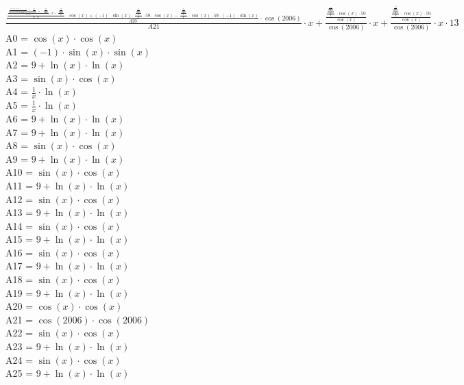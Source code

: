 \documentclass[12pt]{article}
\begin{document}
$\frac{\frac{\frac{\frac{\frac{\frac{\frac{A0 + A1 \cdot A2 - A3 \cdot A4 + A5}{A6 \cdot A7} \cdot x - \frac{A8}{A9}}{x \cdot x} \cdot x - \frac{\frac{A10}{A11}}{x}}{x \cdot x} \cdot x - \frac{\frac{\frac{A12}{A13}}{x}}{x}}{x \cdot x} \cdot x - \frac{\frac{\frac{\frac{A14}{A15}}{x}}{x}}{x}}{x \cdot x} \cdot \cos(x) + (-1) \cdot \sin(x) \cdot \frac{\frac{\frac{\frac{\frac{A16}{A17}}{x}}{x}}{x}}{x} \cdot 59 \cdot \cos(x) - \frac{\frac{\frac{\frac{\frac{A18}{A19}}{x}}{x}}{x}}{x} \cdot \cos(x) \cdot 59 \cdot (-1) \cdot \sin(x)}{A20} \cdot \cos(2006)}{A21} \cdot x + \frac{\frac{\frac{\frac{\frac{\frac{\frac{A22}{A23}}{x}}{x}}{x}}{x} \cdot \cos(x) \cdot 59}{\cos(x)}}{\cos(2006)} \cdot x + \frac{\frac{\frac{\frac{\frac{\frac{\frac{A24}{A25}}{x}}{x}}{x}}{x} \cdot \cos(x) \cdot 59}{\cos(x)}}{\cos(2006)} \cdot x \cdot 13$ \\ 
A0 = $\cos(x) \cdot \cos(x)$ \\ 
A1 = $(-1) \cdot \sin(x) \cdot \sin(x)$ \\ 
A2 = $9 + \ln(x) \cdot \ln(x)$ \\ 
A3 = $\sin(x) \cdot \cos(x)$ \\ 
A4 = $\frac{1}{x} \cdot \ln(x)$ \\ 
A5 = $\frac{1}{x} \cdot \ln(x)$ \\ 
A6 = $9 + \ln(x) \cdot \ln(x)$ \\ 
A7 = $9 + \ln(x) \cdot \ln(x)$ \\ 
A8 = $\sin(x) \cdot \cos(x)$ \\ 
A9 = $9 + \ln(x) \cdot \ln(x)$ \\ 
A10 = $\sin(x) \cdot \cos(x)$ \\ 
A11 = $9 + \ln(x) \cdot \ln(x)$ \\ 
A12 = $\sin(x) \cdot \cos(x)$ \\ 
A13 = $9 + \ln(x) \cdot \ln(x)$ \\ 
A14 = $\sin(x) \cdot \cos(x)$ \\ 
A15 = $9 + \ln(x) \cdot \ln(x)$ \\ 
A16 = $\sin(x) \cdot \cos(x)$ \\ 
A17 = $9 + \ln(x) \cdot \ln(x)$ \\ 
A18 = $\sin(x) \cdot \cos(x)$ \\ 
A19 = $9 + \ln(x) \cdot \ln(x)$ \\ 
A20 = $\cos(x) \cdot \cos(x)$ \\ 
A21 = $\cos(2006) \cdot \cos(2006)$ \\ 
A22 = $\sin(x) \cdot \cos(x)$ \\ 
A23 = $9 + \ln(x) \cdot \ln(x)$ \\ 
A24 = $\sin(x) \cdot \cos(x)$ \\ 
A25 = $9 + \ln(x) \cdot \ln(x)$ \\ 
\end{document}
